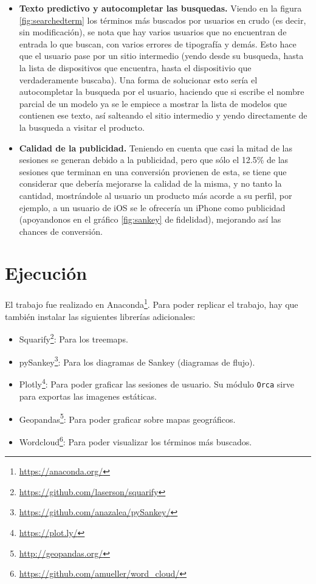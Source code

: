 \documentclass[a4paper]{article}
\begin{document}
\begin{itemize}
\item \textbf{Texto predictivo y autocompletar las busquedas.} Viendo en la figura \ref{fig:searchedterm} los términos más buscados por usuarios en crudo (es decir, sin modificación), se nota que hay varios usuarios que no encuentran de entrada lo que buscan, con varios errores de tipografía y demás. Esto hace que el usuario pase por un sitio intermedio (yendo desde su busqueda, hasta la lista de dispositivos que encuentra, hasta el dispositivio que verdaderamente buscaba). Una forma de solucionar esto sería el autocompletar la busqueda por el usuario, haciendo que si escribe el nombre parcial de un modelo ya se le empiece a mostrar la lista de modelos que contienen ese texto, así salteando el sitio intermedio y yendo directamente de la busqueda a visitar el producto. 

\item \textbf{Calidad de la publicidad.} Teniendo en cuenta que casi la mitad de las sesiones se generan debido a la publicidad, pero que sólo el 12.5\% de las sesiones que terminan en una conversión provienen de esta, se tiene que considerar que debería mejorarse la calidad de la misma, y no tanto la cantidad, mostrándole al usuario un producto más acorde a su perfil, por ejemplo, a un usuario de iOS se le ofrecería un iPhone como publicidad (apoyandonos en el gráfico \ref{fig:sankey} de fidelidad), mejorando así las chances de conversión.

\end{itemize}

\newpage
\appendix

\section{Ejecución}

El trabajo fue realizado en Anaconda\footnote{\url{https://anaconda.org/}}. Para poder replicar el trabajo, hay que también instalar las siguientes librerías adicionales:

\begin{itemize}
	\item{Squarify\footnote{\url{https://github.com/laserson/squarify}}: Para los treemaps.}
	\item{pySankey\footnote{\url{https://github.com/anazalea/pySankey/}}: Para los diagramas de Sankey (diagramas de flujo).}
	\item{Plotly\footnote{\url{https://plot.ly/}}: Para poder graficar las sesiones de usuario. Su módulo \texttt{Orca} sirve para exportas las imagenes estáticas.}
	\item{Geopandas\footnote{\url{http://geopandas.org/}}: Para poder graficar sobre mapas geográficos.}
	\item{Wordcloud\footnote{\url{https://github.com/amueller/word_cloud/}}: Para poder visualizar los términos más buscados.}
\end{itemize}
\end{document}
